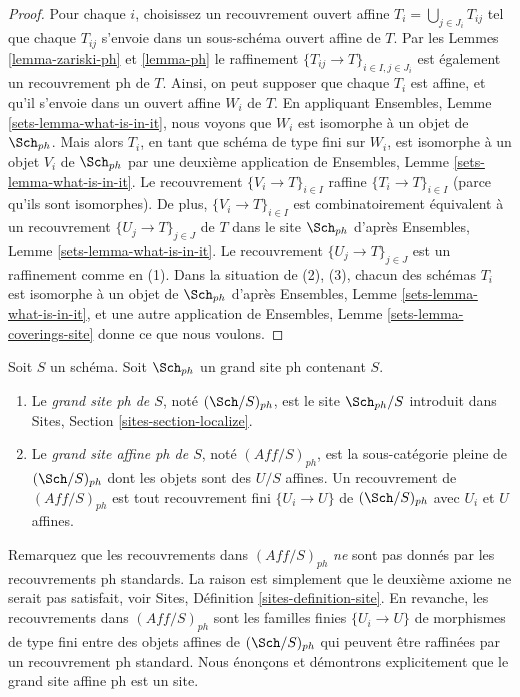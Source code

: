 \begin{proof}
Pour chaque $i$, choisissez un recouvrement ouvert affine $T_i = \bigcup_{j \in J_i} T_{ij}$ tel que chaque $T_{ij}$ s'envoie dans un sous-schéma ouvert affine de $T$. Par les Lemmes \ref{lemma-zariski-ph} et \ref{lemma-ph} le raffinement $\{T_{ij} \to T\}_{i \in I, j \in J_i}$ est également un recouvrement ph de $T$. Ainsi, on peut supposer que chaque $T_i$ est affine, et qu'il s'envoie dans un ouvert affine $W_i$ de $T$. En appliquant Ensembles, Lemme \ref{sets-lemma-what-is-in-it}, nous voyons que $W_i$ est isomorphe à un objet de $\Sch_{ph}$. Mais alors $T_i$, en tant que schéma de type fini sur $W_i$, est isomorphe à un objet $V_i$ de $\Sch_{ph}$ par une deuxième application de Ensembles, Lemme \ref{sets-lemma-what-is-in-it}. Le recouvrement $\{V_i \to T\}_{i \in I}$ raffine $\{T_i \to T\}_{i \in I}$ (parce qu'ils sont isomorphes). De plus, $\{V_i \to T\}_{i \in I}$ est combinatoirement équivalent à un recouvrement $\{U_j \to T\}_{j \in J}$ de $T$ dans le site $\Sch_{ph}$ d'après Ensembles, Lemme \ref{sets-lemma-what-is-in-it}. Le recouvrement $\{U_j \to T\}_{j \in J}$ est un raffinement comme en (1). Dans la situation de (2), (3), chacun des schémas $T_i$ est isomorphe à un objet de $\Sch_{ph}$ d'après Ensembles, Lemme \ref{sets-lemma-what-is-in-it}, et une autre application de Ensembles, Lemme \ref{sets-lemma-coverings-site} donne ce que nous voulons.
\end{proof}


\begin{definition}
\label{definition-big-small-ph}
Soit $S$ un schéma. Soit $\Sch_{ph}$ un grand site ph contenant $S$.
\begin{enumerate}
\item Le {\it grand site ph de $S$}, noté $(\Sch/S)_{ph}$, est le site $\Sch_{ph}/S$ introduit dans Sites, Section \ref{sites-section-localize}.
\item Le {\it grand site affine ph de $S$}, noté $(\textit{Aff}/S)_{ph}$, est la sous-catégorie pleine de $(\Sch/S)_{ph}$ dont les objets sont des $U/S$ affines. Un recouvrement de $(\textit{Aff}/S)_{ph}$ est tout recouvrement fini $\{U_i \to U\}$ de $(\Sch/S)_{ph}$ avec $U_i$ et $U$ affines.
\end{enumerate}
\end{definition}

\noindent
Remarquez que les recouvrements dans $(\textit{Aff}/S)_{ph}$ {\it ne} sont pas donnés par les recouvrements ph standards. La raison est simplement que le deuxième axiome ne serait pas satisfait, voir Sites, Définition \ref{sites-definition-site}. En revanche, les recouvrements dans $(\textit{Aff}/S)_{ph}$ sont les familles finies $\{U_i \to U\}$ de morphismes de type fini entre des objets affines de $(\Sch/S)_{ph}$ qui peuvent être raffinées par un recouvrement ph standard. Nous énonçons et démontrons explicitement que le grand site affine ph est un site.

